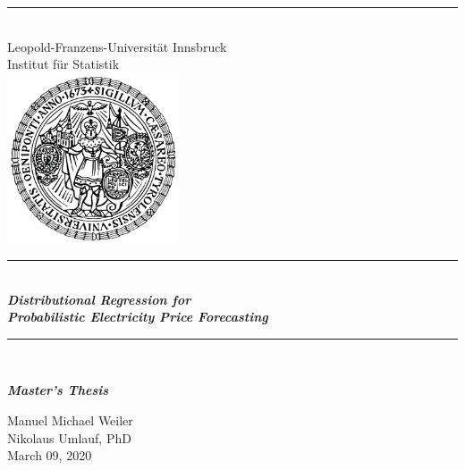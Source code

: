 \documentclass[a4paper, 12pt, headsepline]{scrreprt}
\begin{document}
\begin{titlepage}
  \thispagestyle{empty}
  \begin{center}
      \rule{0.5\textwidth}{0.2ex}\\
        \sffamily\Large
        \onehalfspacing
        Leopold-Franzens-Universität Innsbruck
        \\Institut für Statistik\\
    \includegraphics[width=2in]{siegel.png}\\
  \rule{\linewidth}{0.2ex}\\
    \hspace{1ex} 
        \sffamily\Large
    \onehalfspacing\textbf{\textit{Distributional Regression for \\Probabilistic Electricity Price Forecasting}}\\

  \rule{\linewidth}{0.2ex}\\

\sffamily\Large
\textbf{\textit{Master's Thesis}} \\

\sffamily\normalsize
\textbf{\textit{}} Manuel Michael Weiler\\
\textbf{\textit{}} Nikolaus Umlauf, PhD\\
\textbf{\textit{}} March 09, 2020\\
\end{center}
\end{titlepage}
\end{document}
